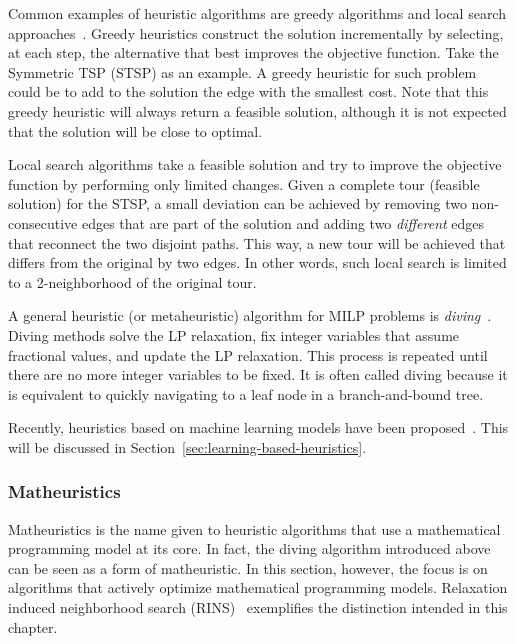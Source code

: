 Common examples of heuristic algorithms are greedy algorithms and local search approaches~\cite{nemhauserIntegerCombinatorialOptimization1999,wolseyIntegerProgramming1998}.
Greedy heuristics construct the solution incrementally by selecting, at each step, the alternative that best improves the objective function.
Take the Symmetric TSP (STSP) as an example.
A greedy heuristic for such problem could be to add to the solution the edge with the smallest cost.
Note that this greedy heuristic will always return a feasible solution, although it is not expected that the solution will be close to optimal.

Local search algorithms take a feasible solution and try to improve the objective function by performing only limited changes.
Given a complete tour (feasible solution) for the STSP, a small deviation can be achieved by removing two non-consecutive edges that are part of the solution and adding two \emph{different} edges that reconnect the two disjoint paths.
This way, a new tour will be achieved that differs from the original by two edges.
In other words, such local search is limited to a 2-neighborhood of the original tour.

A general heuristic (or metaheuristic) algorithm for MILP problems is \emph{diving}~\cite{fischettiHeuristicsMixedInteger2011}.
Diving methods solve the LP relaxation, fix integer variables that assume fractional values, and update the LP relaxation.
This process is repeated until there are no more integer variables to be fixed.
It is often called diving because it is equivalent to quickly navigating to a leaf node in a branch-and-bound tree.

Recently, heuristics based on machine learning models have been proposed~\cite{bengioMachineLearningCombinatorial2021}.
This will be discussed in Section~\ref{sec:learning-based-heuristics}.

\subsubsection{Matheuristics}\label{sec:matheuristics}

Matheuristics is the name given to heuristic algorithms that use a mathematical programming model at its core.
In fact, the diving algorithm introduced above can be seen as a form of matheuristic.
In this section, however, the focus is on algorithms that actively optimize mathematical programming models.
Relaxation induced neighborhood search (RINS)~\cite{maniezzoMatheuristicsAlgorithmsImplementations2021} exemplifies the distinction intended in this chapter.

